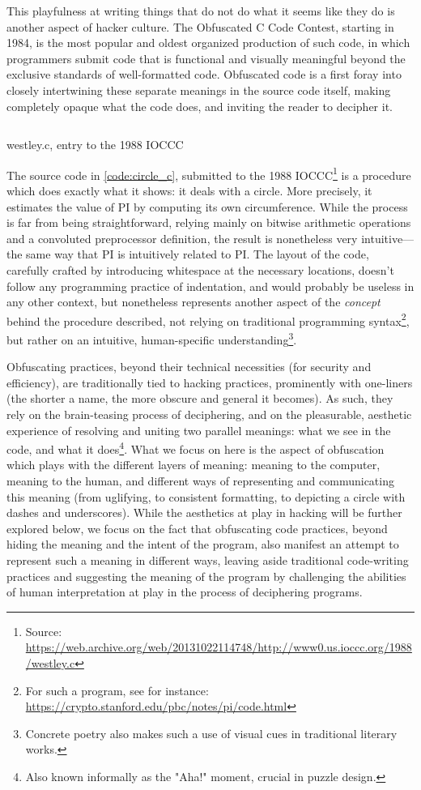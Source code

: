 This playfulness at writing things that do not do what it seems like they do is another aspect of hacker culture. The Obfuscated C Code Contest, starting in 1984, is the most popular and oldest organized production of such code, in which programmers submit code that is functional and visually meaningful beyond the exclusive standards of well-formatted code. Obfuscated code is a first foray into closely intertwining these separate meanings in the source code itself, making completely opaque what the code does, and inviting the reader to decipher it.

\begin{listing}
  \inputminted{c}{./corpus/circle.c}
  \caption{westley.c, entry to the 1988 IOCCC}
  \label{code:circle_c}
\end{listing}

The source code in \ref{code:circle_c}, submitted to the 1988 IOCCC\footnote{Source: \url{https://web.archive.org/web/20131022114748/http://www0.us.ioccc.org/1988/westley.c}} is a procedure which does exactly what it shows: it deals with a circle. More precisely, it estimates the value of PI by computing its own circumference. While the process is far from being straightforward, relying mainly on bitwise arithmetic operations and a convoluted preprocessor definition, the result is nonetheless very intuitive—the same way that PI is intuitively related to PI. The layout of the code, carefully crafted by introducing whitespace at the necessary locations, doesn't follow any programming practice of indentation, and would probably be useless in any other context, but nonetheless represents another aspect of the \emph{concept} behind the procedure described, not relying on traditional programming syntax\footnote{For such a program, see for instance: \url{https://crypto.stanford.edu/pbc/notes/pi/code.html}}, but rather on an intuitive, human-specific understanding\footnote{Concrete poetry also makes such a use of visual cues in traditional literary works.}.

Obfuscating practices, beyond their technical necessities (for security and efficiency), are traditionally tied to hacking practices, prominently with one-liners (the shorter a name, the more obscure and general it becomes). As such, they rely on the brain-teasing process of deciphering, and on the pleasurable, aesthetic experience of resolving and uniting two parallel meanings: what we see in the code, and what it does\footnote{Also known informally as the "Aha!" moment, crucial in puzzle design.}. What we focus on here is the aspect of obfuscation which plays with the different layers of meaning: meaning to the computer, meaning to the human, and different ways of representing and communicating this meaning (from uglifying, to consistent formatting, to depicting a circle with dashes and underscores). While the aesthetics at play in hacking will be further explored below, we focus on the fact that obfuscating code practices, beyond hiding the meaning and the intent of the program, also manifest an attempt to represent such a meaning in different ways, leaving aside traditional code-writing practices and suggesting the meaning of the program by challenging the abilities of human interpretation at play in the process of deciphering programs.

